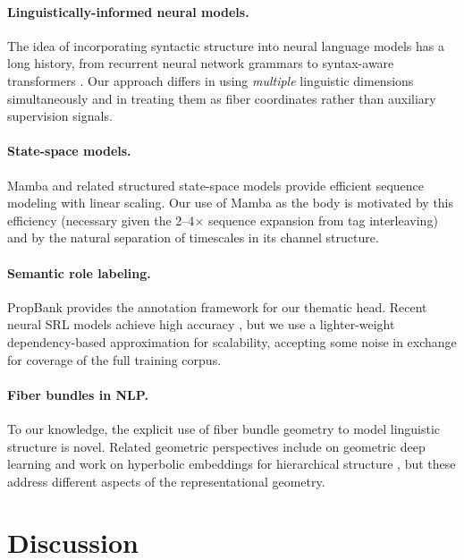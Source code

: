 \documentclass[11pt]{article}
\begin{document}
\paragraph{Linguistically-informed neural models.}
The idea of incorporating syntactic structure into neural language models 
has a long history, from recurrent neural network grammars 
\cite{dyer2016recurrent} to syntax-aware transformers 
\cite{strubell2018linguistically}. Our approach differs in using 
\emph{multiple} linguistic dimensions simultaneously and in treating them 
as fiber coordinates rather than auxiliary supervision signals.

\paragraph{State-space models.}
Mamba \cite{gu2023mamba} and related structured state-space models provide 
efficient sequence modeling with linear scaling. Our use of Mamba as the 
body is motivated by this efficiency (necessary given the 2--4$\times$ 
sequence expansion from tag interleaving) and by the natural separation 
of timescales in its channel structure.

\paragraph{Semantic role labeling.}
PropBank \cite{palmer2005proposition} provides the annotation framework for 
our thematic head. Recent neural SRL models achieve high accuracy 
\cite{shi2019simple}, but we use a lighter-weight dependency-based 
approximation for scalability, accepting some noise in exchange for 
coverage of the full training corpus.

\paragraph{Fiber bundles in NLP.}
To our knowledge, the explicit use of fiber bundle geometry to model 
linguistic structure is novel. Related geometric perspectives include 
\citet{bronstein2021geometric} on geometric deep learning and work on 
hyperbolic embeddings for hierarchical structure \cite{nickel2017poincare}, 
but these address different aspects of the representational geometry.

\section{Discussion}
\label{sec:discussion}
\end{document}
